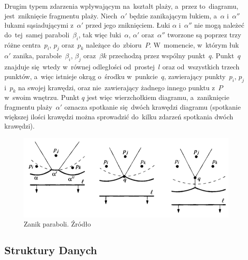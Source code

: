 \documentclass[skorowidz,autorrok,backref,xodstep,oswiadczenie]{wmimgr}
\begin{document}
Drugim typem zdarzenia wpływającym na~kształt plaży, a~przez to~diagramu, jest~zniknięcie fragmentu plaży. Niech~$\alpha'$ będzie zanikającym łukiem, a~$\alpha$ i~$\alpha''$ łukami sąsiadującymi z~$\alpha'$ przed jego zniknięciem. Łuki $\alpha$ i~$\alpha''$ nie mogą należeć do~tej~samej paraboli~$\beta_{i}$, tak więc łuki~$\alpha$, $\alpha'$ oraz~$\alpha''$ tworzone są poprzez trzy różne centra~$p_{i}$, $p_{j}$ oraz~$p_{k}$ należące do~zbioru~$P$. W~momencie, w~którym łuk~$\alpha'$ zanika, parabole~$\beta_{i}$, $\beta_{j}$ oraz~$\beta{k}$ przechodzą przez wspólny punkt~$q$. Punkt~$q$ znajduje się~wtedy w~równej odległości od~prostej~$l$ oraz od~wszystkich trzech punktów, a~więc istnieje okrąg o~środku w~punkcie~$q$, zawierający punkty~$p_{i}$, $p_{j}$ i~$p_{k}$ na swojej krawędzi, oraz nie~zawierający żadnego innego punktu z~$P$ w~swoim wnętrzu. Punkt $q$ jest więc wierzchołkiem diagramu, a~zaniknięcie fragmentu plaży~$\alpha'$ oznacza spotkanie się~dwóch krawędzi diagramu (spotkanie większej ilości krawędzi można sprowadzić do~kilku zdarzeń spotkania dwóch krawędzi).

\begin{figure}[ht!]
\centering
\includegraphics[width=150mm]{images/voronoi6.png}
\caption{Zanik paraboli. Źródło \cite{geometria}}
\label{voronoidelarc}
\end{figure}

\subsection{Struktury Danych}
\end{document}
